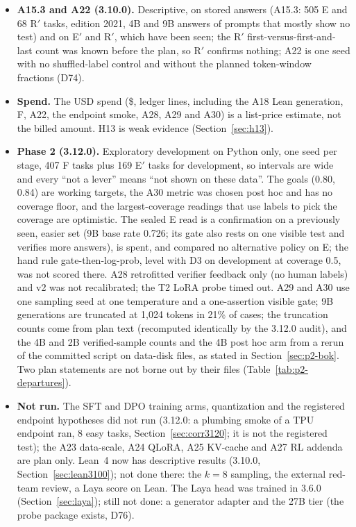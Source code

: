 \documentclass[11pt,a4paper]{article}
\begin{document}
\begin{itemize}
\item \textbf{A15.3 and A22 (3.10.0).} Descriptive, on stored answers (A15.3: 505 E and 68 R$'$ tasks, edition 2021, 4B and 9B answers of prompts that mostly show no test) and on E$'$ and R$'$, which have been seen; the R$'$ first-versus-first-and-last count was known before the plan, so R$'$ confirms nothing; A22 is one seed with no shuffled-label control and without the planned token-window fractions (D74).
\item \textbf{Spend.} The USD spend (\$\SpendTotalNow, \SpendLinesNow{} ledger lines, including the A18 Lean generation, F, A22, the endpoint smoke, A28, A29 and A30) is a list-price estimate, not the billed amount. H13 is weak
  evidence (Section~\ref{sec:h13}).
\item \textbf{Phase 2 (3.12.0).} Exploratory development on Python only, one seed per stage, 407 F tasks plus 169 E$'$ tasks for development, so intervals are wide and every ``not a lever'' means ``not shown on these data''. The goals (0.80, 0.84) are working targets, the A30 metric was chosen post hoc and has no coverage floor, and the largest-coverage readings that use labels to pick the coverage are optimistic. The sealed E read is a confirmation on a previously seen, easier set (9B base rate 0.726; its gate also rests on one visible test and verifies more answers), is spent, and compared no alternative policy on E; the hand rule gate-then-log-prob, level with D3 on development at coverage 0.5, was not scored there. A28 retrofitted verifier feedback only (no human labels) and v2 was not recalibrated; the T2 LoRA probe timed out. A29 and A30 use one sampling seed at one temperature and a one-assertion visible gate; 9B generations are truncated at 1,024 tokens in 21\% of cases; the truncation counts come from plan text (recomputed identically by the 3.12.0 audit), and the 4B and 2B verified-sample counts and the 4B post hoc arm from a rerun of the committed script on data-disk files, as stated in Section~\ref{sec:p2-bok}. Two plan statements are not borne out by their files (Table~\ref{tab:p2-departures}).
\item \textbf{Not run.} The SFT and DPO training arms, quantization and the registered endpoint hypotheses did not run (3.12.0: a plumbing smoke of a TPU endpoint ran, 8 easy tasks, Section~\ref{sec:corr3120}; it is not the registered test); the A23 data-scale, A24 QLoRA, A25 KV-cache and A27 RL addenda are plan only. Lean~4 now has descriptive results (3.10.0, Section~\ref{sec:lean3100}); not done there: the $k=8$ sampling, the external red-team review, a Laya score on Lean. The Laya head was trained in 3.6.0 (Section~\ref{sec:laya}); still not done: a generator adapter and the 27B tier (the probe package exists, D76).
\end{itemize}
\end{document}
